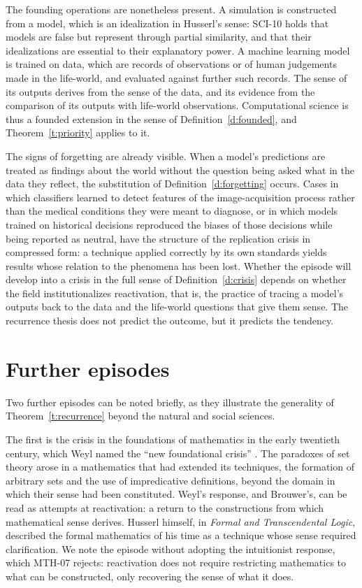 \documentclass{situationist-preprint}
\begin{document}
The founding operations are nonetheless present. A simulation is constructed from a model, which is an idealization in Husserl's sense: SCI-10 holds that models are false but represent through partial similarity, and that their idealizations are essential to their explanatory power. A machine learning model is trained on data, which are records of observations or of human judgements made in the life-world, and evaluated against further such records. The sense of its outputs derives from the sense of the data, and its evidence from the comparison of its outputs with life-world observations. Computational science is thus a founded extension in the sense of Definition~\ref{d:founded}, and Theorem~\ref{t:priority} applies to it.

The signs of forgetting are already visible. When a model's predictions are treated as findings about the world without the question being asked what in the data they reflect, the substitution of Definition~\ref{d:forgetting} occurs. Cases in which classifiers learned to detect features of the image-acquisition process rather than the medical conditions they were meant to diagnose, or in which models trained on historical decisions reproduced the biases of those decisions while being reported as neutral, have the structure of the replication crisis in compressed form: a technique applied correctly by its own standards yields results whose relation to the phenomena has been lost. Whether the episode will develop into a crisis in the full sense of Definition~\ref{d:crisis} depends on whether the field institutionalizes reactivation, that is, the practice of tracing a model's outputs back to the data and the life-world questions that give them sense. The recurrence thesis does not predict the outcome, but it predicts the tendency.

\section{Further episodes}\label{s:further}

Two further episodes can be noted briefly, as they illustrate the generality of Theorem~\ref{t:recurrence} beyond the natural and social sciences.

The first is the crisis in the foundations of mathematics in the early twentieth century, which Weyl named the \enquote{new foundational crisis} \citep{Weyl1921}. The paradoxes of set theory arose in a mathematics that had extended its techniques, the formation of arbitrary sets and the use of impredicative definitions, beyond the domain in which their sense had been constituted. Weyl's response, and Brouwer's, can be read as attempts at reactivation: a return to the constructions from which mathematical sense derives. Husserl himself, in \emph{Formal and Transcendental Logic}, described the formal mathematics of his time as a technique whose sense required clarification. We note the episode without adopting the intuitionist response, which MTH-07 rejects: reactivation does not require restricting mathematics to what can be constructed, only recovering the sense of what it does.
\end{document}
